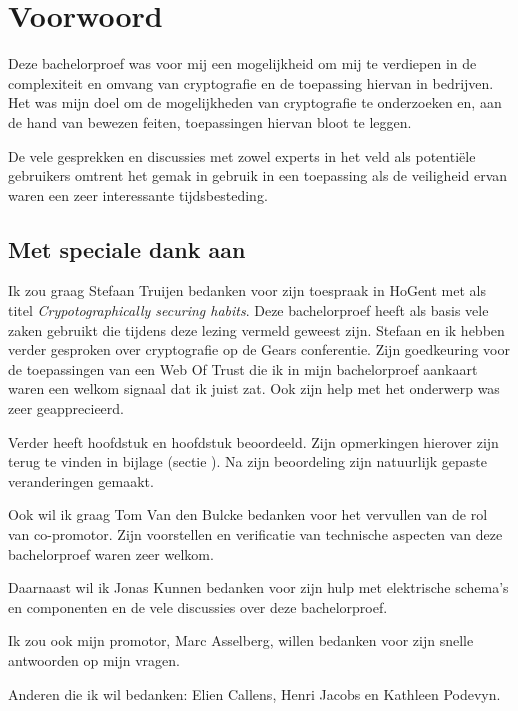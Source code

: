 
\chapter*{Voorwoord}
\label{ch:voorwoord}


Deze bachelorproef was voor mij een mogelijkheid om mij te verdiepen in de
complexiteit en omvang van cryptografie en de toepassing hiervan in bedrijven.
Het was mijn doel om de mogelijkheden van cryptografie te onderzoeken en, aan de
hand van bewezen feiten, toepassingen hiervan bloot te leggen.

De vele gesprekken en discussies met zowel experts in het veld als potentiële
gebruikers omtrent het gemak in gebruik in een toepassing als de veiligheid
ervan waren een zeer interessante tijdsbesteding.

\section*{Met speciale dank aan}
Ik zou graag Stefaan Truijen bedanken voor zijn toespraak in HoGent met als
titel \textit{Crypotographically securing habits}. Deze bachelorproef heeft als
basis vele zaken gebruikt die tijdens deze lezing vermeld geweest zijn. Stefaan
en ik hebben verder gesproken over cryptografie op de Gears conferentie. Zijn
goedkeuring voor de toepassingen van een Web Of Trust die ik in mijn
bachelorproef aankaart waren een welkom signaal dat ik juist zat. Ook zijn help
met het onderwerp \textit{}  was
zeer geapprecieerd.

Verder heeft \textcite{TruijenStefaan} hoofdstuk
 en hoofdstuk
 beoordeeld. Zijn opmerkingen
hierover zijn terug te vinden in bijlage (sectie
). Na zijn beoordeling zijn
natuurlijk gepaste veranderingen gemaakt.

Ook wil ik graag Tom Van den Bulcke bedanken voor het vervullen van de rol van co-promotor. Zijn voorstellen en verificatie van technische aspecten van deze bachelorproef waren zeer welkom.

Daarnaast wil ik Jonas Kunnen bedanken voor zijn hulp met elektrische schema's en componenten en de vele discussies over deze bachelorproef.

Ik zou ook mijn promotor, Marc Asselberg, willen bedanken voor zijn snelle antwoorden op mijn vragen.

Anderen die ik wil bedanken: Elien Callens, Henri Jacobs en Kathleen Podevyn.
